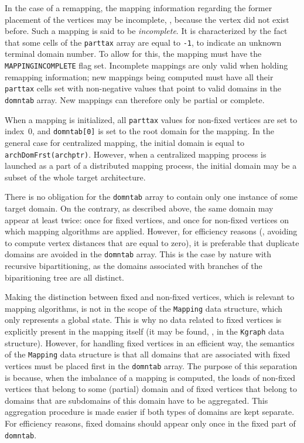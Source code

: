 In the case of a remapping, the mapping information regarding the
former placement of the vertices may be incomplete, \eg, because the
vertex did not exist before. Such a mapping is said to be
\textit{incomplete}. It is characterized by the fact that some cells
of the \texttt{parttax} array are equal to \texttt{-1}, to indicate an
unknown terminal domain number. To allow for this, the mapping must
have the \texttt{MAPPING\lbt INCOMPLETE} flag set. Incomplete mappings
are only valid when holding remapping information; new mappings being
computed must have all their \texttt{parttax} cells set with
non-negative values that point to valid domains in the
\texttt{domntab} array. New mappings can therefore only be partial or
complete.

When a mapping is initialized, all \texttt{parttax} values for
non-fixed vertices are set to index~$0$, and \texttt{domntab[0]} is
set to the root domain for the mapping. In the general case for
centralized mapping, the initial domain is equal to
\texttt{archDomFrst(archptr)}. However, when a centralized mapping
process is launched as a part of a distributed mapping process, the
initial domain may be a subset of the whole target architecture.

There is no obligation for the \texttt{domntab} array to contain only
one instance of some target domain. On the contrary, as described
above, the same domain may appear at least twice: once for fixed
vertices, and once for non-fixed vertices on which mapping algorithms
are applied. However, for efficiency reasons (\eg, avoiding to compute
vertex distances that are equal to zero), it is preferable that
duplicate domains are avoided in the \texttt{domntab} array. This is
the case by nature with recursive bipartitioning, as the domains
associated with branches of the biparitioning tree are all distinct.

Making the distinction between fixed and non-fixed vertices, which is
relevant to mapping algorithms, is not in the scope of the
\texttt{Mapping} data structure, which only represents a global
state. This is why no data related to fixed vertices is explicitly
present in the mapping itself (it may be found, \eg, in the
\texttt{Kgraph} data structure).
However, for handling fixed vertices in an efficient way, the
semantics of the \texttt{Mapping} data structure is that all domains
that are associated with fixed vertices must be placed first in the
\texttt{domntab} array. The purpose of this separation is because,
when the imbalance of a mapping is computed, the loads of non-fixed
vertices that belong to some (partial) domain and of fixed vertices
that belong to domains that are subdomains of this domain have to be
aggregated. This aggregation procedure is made easier if both types of
domains are kept separate. For efficiency reasons, fixed domains
should appear only once in the fixed part of \texttt{domntab}.
\\

